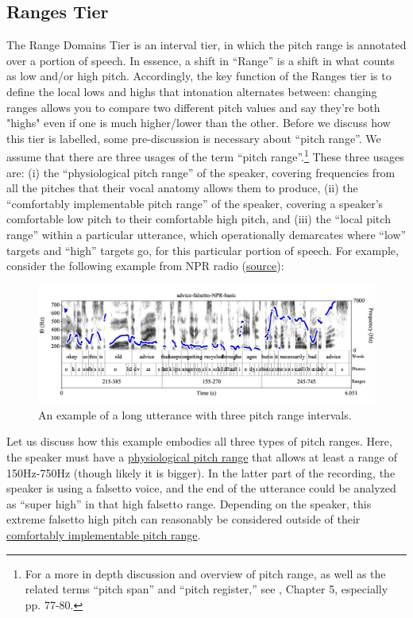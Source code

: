 \documentclass[11pt, twoside]{memoir}
\begin{document}
\subsection{Ranges Tier}\label{sec:ranges}
The Range Domains Tier is an interval tier, in which the pitch range is annotated over a portion of speech. In essence, a shift in “Range” is a shift in what counts as low and/or high pitch.
Accordingly, the key function of the Ranges tier is to define the local lows and highs that intonation alternates between: changing ranges allows you to compare two different pitch values and say they’re both "highs" even if one is much higher\slash lower than the other. Before we discuss how this tier is labelled, some pre-discussion is necessary about “pitch range”.
We assume that there are three usages of the term “pitch range”.\footnote{For a more in depth discussion and overview of pitch range, as well as the related terms “pitch span” and “pitch register,” see \citealt{gussenhoven04}, Chapter 5, especially pp. 77-80.} These three usages are: (i) the “physiological pitch range” of the speaker, covering frequencies from all the pitches that their vocal anatomy allows them to produce, (ii) the “comfortably implementable pitch range” of the speaker, covering a speaker’s comfortable low pitch to their comfortable high pitch, and (iii) the “local pitch range” within a particular utterance, which operationally demarcates where “low” targets and “high” targets go, for this particular portion of speech.
For example, consider the following example from NPR radio (\href{https://www.npr.org/sections/goatsandsoda/2018/05/11/603315432/the-best-mothers-day-gift-get-mom-out-of-the-box}{source}):
\begin{figure}[H]
\centering
\includegraphics[width=\linewidth]{Ranges-advice-falsetto-basic-all-3-ranges.png}
\caption{An example of a long utterance with three pitch range intervals.
\label{fig:advice-falsetto Ranges basic}
}
\end{figure}
Let us discuss how this example embodies all three types of pitch ranges. Here, the speaker must have a \uline{physiological pitch range} that allows at least a range of 150Hz-750Hz (though likely it is bigger). In the latter part of the recording, the speaker is using a falsetto voice, and the end of the utterance could be analyzed as “super high” in that high falsetto range. Depending on the speaker, this extreme falsetto high pitch can reasonably be considered outside of their \uline{comfortably implementable pitch range}.
\end{document}
